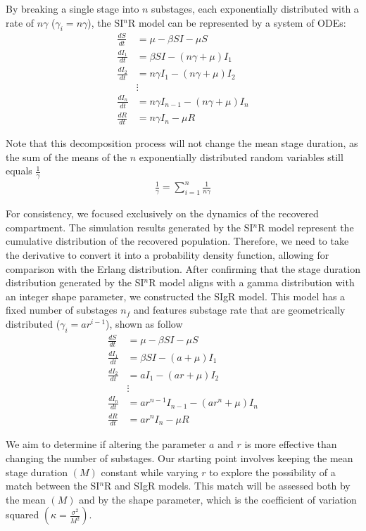 \documentclass[12pt]{article}
\begin{document}
By breaking a single stage into $n$ substages, each exponentially distributed with a rate of $n\gamma$ ($\gamma_i = n\gamma$), the SI$^n$R model can be represented by a system of ODEs:
\begin{align*}
    \frac{dS}{dt} &= \mu - \beta SI - \mu S \\
    \frac{dI_1}{dt} &= \beta SI - (n \gamma + \mu) I_1 \\
    \frac{dI_2}{dt} &= n\gamma I_1 - (n \gamma + \mu) I_2 \\
    &\vdots \\
    \frac{dI_n}{dt} &= n\gamma I_{n-1} - (n \gamma + \mu) I_n \\
    \frac{dR}{dt} &= n \gamma I_n - \mu R
\end{align*}

Note that this decomposition process will not change the mean stage duration, as the sum of the means of the $n$ exponentially distributed random variables still equals $\frac{1}{\gamma}$
\begin{align*}
    \frac{1}{\gamma} = \sum_{i=1}^{n} \frac{1}{n\gamma}
\end{align*}

For consistency, we focused exclusively on the dynamics of the recovered compartment. The simulation results generated by the SI$^n$R model represent the cumulative distribution of the recovered population. Therefore, we need to take the derivative to convert it into a probability density function, allowing for comparison with the Erlang distribution. After confirming that the stage duration distribution generated by the SI$^n$R model aligns with a gamma distribution with an integer shape parameter, we constructed the SIgR model. This model has a fixed number of substages $n_f$ and features substage rate that are geometrically distributed ($\gamma_i = ar^{i-1}$), shown as follow
\begin{align*}
    \frac{dS}{dt} &= \mu - \beta SI - \mu S \\
    \frac{dI_1}{dt} &= \beta SI - (a + \mu) I_1 \\
    \frac{dI_2}{dt} &= a I_1 - (ar + \mu) I_2 \\
    &\vdots \\
    \frac{dI_n}{dt} &= ar^{n-1} I_{n-1} - (ar^n + \mu) I_n \\
    \frac{dR}{dt} &= ar^n I_n - \mu R
\end{align*}

We aim to determine if altering the parameter $a$ and $r$ is more effective than changing the number of substages. Our starting point involves keeping the mean stage duration $(M)$ constant while varying $r$ to explore the possibility of a match between the SI$^n$R and SIgR models. This match will be assessed both by the mean $(M)$ and by the shape parameter, which is the coefficient of variation squared $(\kappa = \frac{\sigma^2}{M^2})$.
\end{document}
